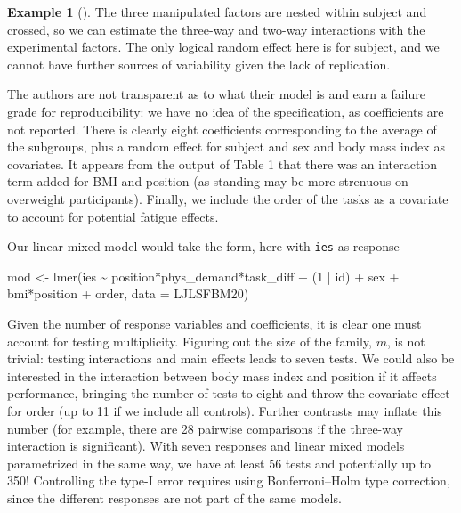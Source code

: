 \documentclass[
  11pt,
  letterpaper,
]{scrbook}
\newenvironment{Shaded}{\begin{snugshade}}{\end{snugshade}}
\newcommand{\AttributeTok}[1]{\textcolor[rgb]{0.40,0.45,0.13}{#1}}
\newcommand{\DecValTok}[1]{\textcolor[rgb]{0.68,0.00,0.00}{#1}}
\newcommand{\FunctionTok}[1]{\textcolor[rgb]{0.28,0.35,0.67}{#1}}
\newcommand{\NormalTok}[1]{\textcolor[rgb]{0.00,0.23,0.31}{#1}}
\newcommand{\OtherTok}[1]{\textcolor[rgb]{0.00,0.23,0.31}{#1}}
\newcommand{\SpecialCharTok}[1]{\textcolor[rgb]{0.37,0.37,0.37}{#1}}
\theoremstyle{definition}
\theoremstyle{definition}
\newtheorem{example}{Example}[chapter]
\theoremstyle{remark}
\begin{document}
\begin{example}[]
The three manipulated factors are nested within subject and crossed, so
we can estimate the three-way and two-way interactions with the
experimental factors. The only logical random effect here is for
subject, and we cannot have further sources of variability given the
lack of replication.

The authors are not transparent as to what their model is and earn a
failure grade for reproducibility: we have no idea of the specification,
as coefficients are not reported. There is clearly eight coefficients
corresponding to the average of the subgroups, plus a random effect for
subject and sex and body mass index as covariates. It appears from the
output of Table 1 that there was an interaction term added for BMI and
position (as standing may be more strenuous on overweight participants).
Finally, we include the order of the tasks as a covariate to account for
potential fatigue effects.

Our linear mixed model would take the form, here with \texttt{ies} as
response

\begin{Shaded}
\begin{Highlighting}[]
\NormalTok{mod }\OtherTok{\textless{}{-}} \FunctionTok{lmer}\NormalTok{(ies }\SpecialCharTok{\textasciitilde{}}\NormalTok{ position}\SpecialCharTok{*}\NormalTok{phys\_demand}\SpecialCharTok{*}\NormalTok{task\_diff }\SpecialCharTok{+}
\NormalTok{  (}\DecValTok{1} \SpecialCharTok{|}\NormalTok{ id) }\SpecialCharTok{+}\NormalTok{ sex }\SpecialCharTok{+}\NormalTok{ bmi}\SpecialCharTok{*}\NormalTok{position }\SpecialCharTok{+}\NormalTok{ order, }
           \AttributeTok{data =}\NormalTok{ LJLSFBM20) }
\end{Highlighting}
\end{Shaded}

Given the number of response variables and coefficients, it is clear one
must account for testing multiplicity. Figuring out the size of the
family, \(m\), is not trivial: testing interactions and main effects
leads to seven tests. We could also be interested in the interaction
between body mass index and position if it affects performance, bringing
the number of tests to eight and throw the covariate effect for order
(up to 11 if we include all controls). Further contrasts may inflate
this number (for example, there are 28 pairwise comparisons if the
three-way interaction is significant). With seven responses and linear
mixed models parametrized in the same way, we have at least 56 tests and
potentially up to 350! Controlling the type-I error requires using
Bonferroni--Holm type correction, since the different responses are not
part of the same models.


\end{example}
\end{document}

